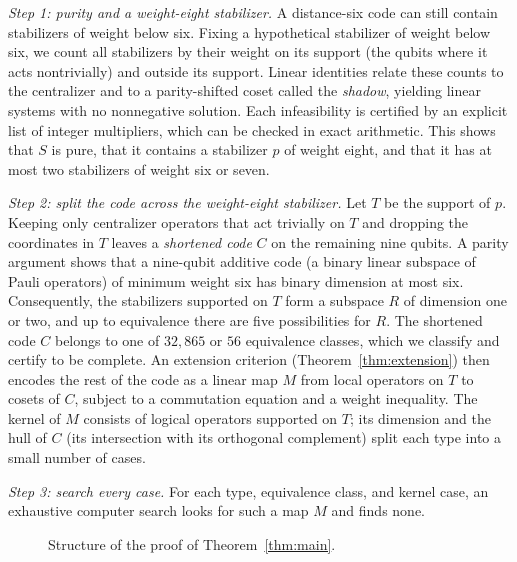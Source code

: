 \documentclass[11pt]{article}
\theoremstyle{definition}
\theoremstyle{remark}
\newcommand{\qc}[1]{[\![#1]\!]}
\begin{document}
\emph{Step 1: purity and a weight-eight stabilizer.} A distance-six code
can still contain stabilizers of weight below six. Fixing a hypothetical
stabilizer of weight below six, we count all stabilizers by their weight
on its support (the qubits where it acts nontrivially) and outside its
support. Linear identities relate these counts to the centralizer and to
a parity-shifted coset called the \emph{shadow}, yielding linear systems
with no nonnegative solution. Each infeasibility is certified by an
explicit list of integer multipliers, which can be checked in exact
arithmetic. This shows that \(S\) is pure, that it contains a stabilizer
\(p\) of weight eight, and that it has at most two stabilizers of weight
six or seven.

\emph{Step 2: split the code across the weight-eight stabilizer.} Let
\(T\) be the support of \(p\). Keeping only centralizer operators that
act trivially on \(T\) and dropping the coordinates in \(T\) leaves a
\emph{shortened code} \(C\) on the remaining nine qubits. A parity
argument shows that a nine-qubit additive code (a binary linear subspace
of Pauli operators) of minimum weight six has binary dimension at most
six. Consequently, the stabilizers supported on \(T\) form a subspace
\(R\) of dimension one or two, and up to equivalence there are five
possibilities for \(R\). The shortened code \(C\) belongs to one of
\(32{,}865\) or \(56\) equivalence classes, which we classify and
certify to be complete. An extension criterion
(Theorem~\ref{thm:extension}) then encodes the rest of the code as a
linear map \(M\) from local operators on \(T\) to cosets of \(C\),
subject to a commutation equation and a weight inequality. The kernel of
\(M\) consists of logical operators supported on \(T\); its dimension
and the hull of \(C\) (its intersection with its orthogonal complement)
split each type into a small number of cases.

\emph{Step 3: search every case.} For each type, equivalence class, and
kernel case, an exhaustive computer search looks for such a map \(M\)
and finds none.

\begin{figure}[htbp]
\centering
{}
\caption{Structure of the proof of Theorem~\ref{thm:main}.}
\label{fig:flow}
\end{figure}
\end{document}
